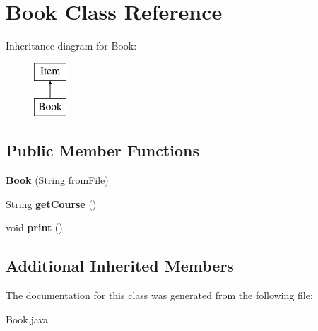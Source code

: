\hypertarget{class_book}{}\section{Book Class Reference}
\label{class_book}
Inheritance diagram for Book\+:\begin{figure}[H]
\begin{center}
\leavevmode
\includegraphics[height=2.000000cm]{class_book}
\end{center}
\end{figure}
\subsection*{Public Member Functions}
\begin{DoxyCompactItemize}
\item 
\hypertarget{class_book_a4aef3c6c555a3c3e4b7c43903add7715}{}{\bfseries Book} (String from\+File)\label{class_book_a4aef3c6c555a3c3e4b7c43903add7715}

\item 
\hypertarget{class_book_a78bd2b22865cf78213049c786aaa32ea}{}String {\bfseries get\+Course} ()\label{class_book_a78bd2b22865cf78213049c786aaa32ea}

\item 
\hypertarget{class_book_a14649f11ec81e6c5b5d59b235160e6a6}{}void {\bfseries print} ()\label{class_book_a14649f11ec81e6c5b5d59b235160e6a6}

\end{DoxyCompactItemize}
\subsection*{Additional Inherited Members}


The documentation for this class was generated from the following file\+:\begin{DoxyCompactItemize}
\item 
Book.\+java\end{DoxyCompactItemize}
